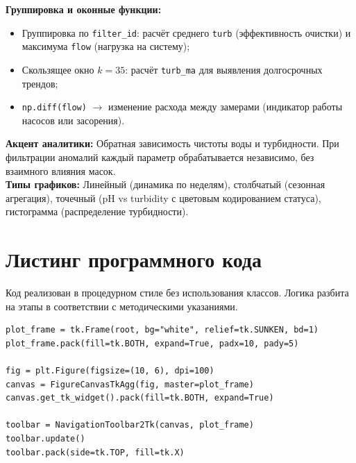 \documentclass[oneside,a4paper,14pt]{extarticle} %
\begin{document}
\textbf{Группировка и оконные функции:}
\begin{itemize}
    \item Группировка по \texttt{filter\_id}: расчёт среднего \texttt{turb} (эффективность очистки) и максимума \texttt{flow} (нагрузка на систему);
    \item Скользящее окно $k=35$: расчёт \texttt{turb\_ma} для выявления долгосрочных трендов;
    \item \texttt{np.diff(flow)} $\rightarrow$ изменение расхода между замерами (индикатор работы насосов или засорения).
\end{itemize}

\textbf{Акцент аналитики:} Обратная зависимость чистоты воды и турбидности. При фильтрации аномалий каждый параметр обрабатывается независимо, без взаимного влияния масок.\\
\textbf{Типы графиков:} Линейный (динамика по неделям), столбчатый (сезонная агрегация), точечный (pH vs turbidity с цветовым кодированием статуса), гистограмма (распределение турбидности).

\section{Листинг программного кода}
Код реализован в процедурном стиле без использования классов. Логика разбита на этапы в соответствии с методическими указаниями.


\newpage




\begin{lstlisting}[caption={Этап 3: Встраивание Figure в Tkinter}]
plot_frame = tk.Frame(root, bg="white", relief=tk.SUNKEN, bd=1)
plot_frame.pack(fill=tk.BOTH, expand=True, padx=10, pady=5)

fig = plt.Figure(figsize=(10, 6), dpi=100)
canvas = FigureCanvasTkAgg(fig, master=plot_frame)
canvas.get_tk_widget().pack(fill=tk.BOTH, expand=True)

toolbar = NavigationToolbar2Tk(canvas, plot_frame)
toolbar.update()
toolbar.pack(side=tk.TOP, fill=tk.X)
\end{lstlisting}
\newpage


\end{document}
